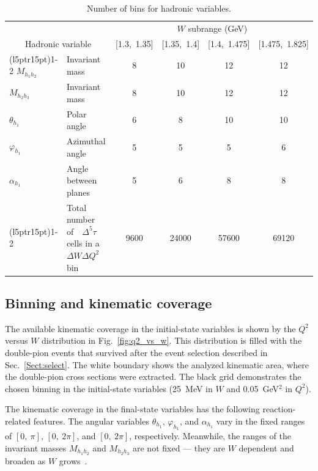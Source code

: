 \documentclass[prc,twocolumn,superscriptaddress,showpacs,amssymb,amsmath,amsfonts,aps,nofootinbib]{revtex4-1}
\begin{document}
\begin{table}[htb]\normalsize
\centering 
  \caption{\small Number of bins for hadronic variables.} \label{tab:summary_bins}
  \begin{tabular}{lm{4cm}cccc}
    \toprule
    & & \multicolumn{4}{c}{$W$ subrange (GeV)} \\
    \multicolumn{2}{c}{\centering Hadronic variable }  & [1.3,~1.35] & [1.35,~1.4] & [1.4,~1.475] & [1.475,~1.825] \\
    \cmidrule(l{5pt}r{15pt}){1-2} \cmidrule(l{5pt}r{5pt}){3-6}
    $M_{h_{1}h_{2}}$   & Invariant mass       &   8  & 10 & 12 & 12  \\
    $M_{h_{2}h_{3}}$   & Invariant mass       &   8  & 10 & 12 & 12  \\
    $\theta_{h_{1}}$   & Polar angle          &   6  & 8  & 10 & 10  \\
    $\varphi_{h_{1}}$  & Azimuthal angle      &   5  & 5  & 5  & 6   \\
    $\alpha_{h_{1}}$   & Angle between planes &   5  & 6  & 8  & 8   \\
    \cmidrule(l{5pt}r{15pt}){1-2} \cmidrule(l{5pt}r{5pt}){3-6}
              & Total~~$\!$number~~$\!$of~~$\!$$\Delta^{5}\tau$ \newline cells in a $\!$$\Delta W \Delta Q^2$ $\!$bin &   9600  & 24000  & 57600  & 69120   \\
    \bottomrule
  \end{tabular}
\end{table}




\subsection{Binning and kinematic coverage}
\label{Sect:binning}


The available kinematic coverage in the initial-state variables is shown by the $Q^2$ versus $W$ distribution in Fig.\!~\ref{fig:q2_vs_w}. This distribution is filled with the double-pion events that survived after the event selection described in Sec.\!~\ref{Sect:select}. The white boundary shows the analyzed kinematic area, where the double-pion cross sections were extracted. The black grid demonstrates the chosen binning in the initial-state variables (25~MeV in $W$ and 0.05~GeV$^{2}$ in $Q^{2}$).


The kinematic coverage in the final-state variables has the following reaction-related features. The angular variables $\theta_{h_{1}}$, $\varphi_{h_{1}}$, and $\alpha_{h_{1}}$ vary in the fixed ranges of $[0,~\pi]$, $[0,~2\pi]$, and $[0,~2\pi]$, respectively. Meanwhile, the ranges of the invariant masses $M_{h_{1}h_{2}}$ and $M_{h_{2}h_{3}}$ are not fixed --- they are $W$ dependent and broaden as $W$ grows~\cite{my_an_note:2020, my_thesis:2021}.
\end{document}
